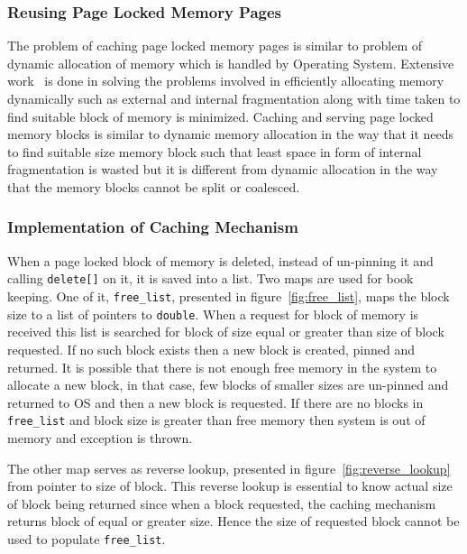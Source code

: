 \subsubsection{Reusing Page Locked Memory Pages}
The problem of caching page locked memory pages is similar to problem of dynamic
allocation of memory which is handled by Operating System. Extensive work~\cite{Wilson1995}
is done in solving the problems involved in efficiently allocating memory dynamically such
as external and internal fragmentation along with time taken to find suitable
block of memory is minimized. Caching and serving page locked memory blocks
is similar to dynamic memory allocation in the way that it needs to find suitable
size memory block such that least space in form of internal fragmentation is wasted
but it is different from dynamic allocation in the way that the memory blocks cannot
be split or coalesced.

\subsubsection{Implementation of Caching Mechanism}
When a page locked block of memory is deleted, instead of un-pinning it and calling
\texttt{delete[]} on it, it is saved into a list. Two maps are used for book
keeping. One of it, \texttt{free\_list}, presented in figure~\ref{fig:free_list},
maps the block size to a list of pointers to \texttt{double}. When a request for
block of memory is received this list is searched for block of size equal or
greater than size of block requested. If no such block exists then a new block
is created, pinned and returned. It is possible that there is not enough free
memory in the system to allocate a new block, in that case, few blocks of smaller
sizes are un-pinned and returned to OS and then a new block is requested. If there
are no blocks in \texttt{free\_list} and block size is greater than free memory
then system is out of memory and exception is thrown.

The other map serves as reverse lookup, presented in figure~\ref{fig:reverse_lookup}
from pointer to size of block. This reverse lookup is essential to know actual
size of block being returned since when a block requested, the caching mechanism
returns block of equal or greater size. Hence the size of requested block cannot
be used to populate \texttt{free\_list}.

